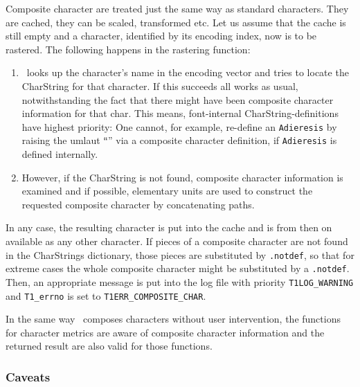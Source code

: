 Composite character are treated just the same way as standard characters.
They are cached, they can be scaled, transformed etc. Let us assume that the
cache is still empty and a character, identified by its encoding index, now is
to be rastered. The following happens in the rastering function:
\begin{enumerate}
\item \tonelib\ looks up the character's name in the encoding vector and tries
  to locate the CharString for that character. If this succeeds all works as
  usual, notwithstanding the fact that there might have been composite
  character information for that char. This means, font-internal
  CharString-definitions have highest priority: One cannot, for example,
  re-define an \verb+Adieresis+ by raising the umlaut ``\"{ }'' via a composite
  character definition, if \verb+Adieresis+ is defined internally.
\item However, if the CharString is not found, composite character information
  is examined and if possible, elementary units are used to construct the
  requested composite character by concatenating paths.
\end{enumerate}
In any case, the resulting character is put into the cache and is from then on
available as any other character. If pieces of a composite character are not
found in the CharStrings dictionary, those pieces are substituted by
\verb+.notdef+, so that for extreme cases the whole composite character might
be substituted by a \verb+.notdef+. Then, an appropriate message is put into
the log file with priority \verb+T1LOG_WARNING+ and \verb+T1_errno+ is set to 
\verb+T1ERR_COMPOSITE_CHAR+.

In the same way \tonelib\ composes characters without user intervention, the
functions for character metrics are aware of composite character information
and the returned result are also valid for those functions.


\subsubsection{Caveats}
\label{subsubsec:Caveats}%

